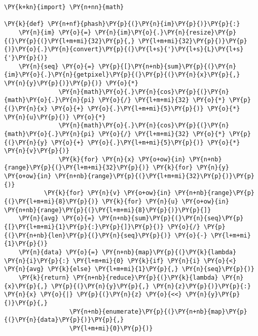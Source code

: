\begin{Verbatim}[commandchars=\\\{\}]
\PY{k+kn}{import} \PY{n+nn}{math}

\PY{k}{def} \PY{n+nf}{phash}\PY{p}{(}\PY{n}{im}\PY{p}{)}\PY{p}{:}
    \PY{n}{im} \PY{o}{=} \PY{n}{im}\PY{o}{.}\PY{n}{resize}\PY{p}{(}\PY{p}{(}\PY{l+m+mi}{32}\PY{p}{,} \PY{l+m+mi}{32}\PY{p}{)}\PY{p}{)}\PY{o}{.}\PY{n}{convert}\PY{p}{(}\PY{l+s}{'}\PY{l+s}{L}\PY{l+s}{'}\PY{p}{)}
    \PY{n}{seq} \PY{o}{=} \PY{p}{[}\PY{n+nb}{sum}\PY{p}{(}\PY{n}{im}\PY{o}{.}\PY{n}{getpixel}\PY{p}{(}\PY{p}{(}\PY{n}{x}\PY{p}{,} \PY{n}{y}\PY{p}{)}\PY{p}{)} \PY{o}{*}
               \PY{n}{math}\PY{o}{.}\PY{n}{cos}\PY{p}{(}\PY{n}{math}\PY{o}{.}\PY{n}{pi} \PY{o}{/} \PY{l+m+mi}{32} \PY{o}{*} \PY{p}{(}\PY{n}{x} \PY{o}{+} \PY{o}{.}\PY{l+m+mi}{5}\PY{p}{)} \PY{o}{*} \PY{n}{u}\PY{p}{)} \PY{o}{*}
               \PY{n}{math}\PY{o}{.}\PY{n}{cos}\PY{p}{(}\PY{n}{math}\PY{o}{.}\PY{n}{pi} \PY{o}{/} \PY{l+m+mi}{32} \PY{o}{*} \PY{p}{(}\PY{n}{y} \PY{o}{+} \PY{o}{.}\PY{l+m+mi}{5}\PY{p}{)} \PY{o}{*} \PY{n}{v}\PY{p}{)}
               \PY{k}{for} \PY{n}{x} \PY{o+ow}{in} \PY{n+nb}{range}\PY{p}{(}\PY{l+m+mi}{32}\PY{p}{)} \PY{k}{for} \PY{n}{y} \PY{o+ow}{in} \PY{n+nb}{range}\PY{p}{(}\PY{l+m+mi}{32}\PY{p}{)}\PY{p}{)}
           \PY{k}{for} \PY{n}{v} \PY{o+ow}{in} \PY{n+nb}{range}\PY{p}{(}\PY{l+m+mi}{8}\PY{p}{)} \PY{k}{for} \PY{n}{u} \PY{o+ow}{in} \PY{n+nb}{range}\PY{p}{(}\PY{l+m+mi}{8}\PY{p}{)}\PY{p}{]}
    \PY{n}{avg} \PY{o}{=} \PY{n+nb}{sum}\PY{p}{(}\PY{n}{seq}\PY{p}{[}\PY{l+m+mi}{1}\PY{p}{:}\PY{p}{]}\PY{p}{)} \PY{o}{/} \PY{p}{(}\PY{n+nb}{len}\PY{p}{(}\PY{n}{seq}\PY{p}{)} \PY{o}{-} \PY{l+m+mi}{1}\PY{p}{)}
    \PY{n}{data} \PY{o}{=} \PY{n+nb}{map}\PY{p}{(}\PY{k}{lambda} \PY{n}{i}\PY{p}{:} \PY{l+m+mi}{0} \PY{k}{if} \PY{n}{i} \PY{o}{<} \PY{n}{avg} \PY{k}{else} \PY{l+m+mi}{1}\PY{p}{,} \PY{n}{seq}\PY{p}{)}
    \PY{k}{return} \PY{n+nb}{reduce}\PY{p}{(}\PY{k}{lambda} \PY{n}{x}\PY{p}{,} \PY{p}{(}\PY{n}{y}\PY{p}{,} \PY{n}{z}\PY{p}{)}\PY{p}{:} \PY{n}{x} \PY{o}{|} \PY{p}{(}\PY{n}{z} \PY{o}{<<} \PY{n}{y}\PY{p}{)}\PY{p}{,}
                  \PY{n+nb}{enumerate}\PY{p}{(}\PY{n+nb}{map}\PY{p}{(}\PY{n}{data}\PY{p}{)}\PY{p}{,}
                  \PY{l+m+mi}{0}\PY{p}{)}
\end{Verbatim}
